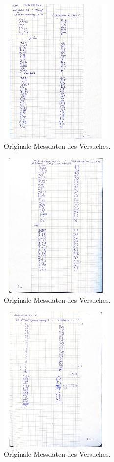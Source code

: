 \begin{figure}[H]
    \centering
    \includegraphics[width=0.5\textwidth]{data/origDaten1.jpg}
    \caption{Originale Messdaten des Versuches.}
    \label{fig:origData1}
\end{figure}
\begin{figure}[H]
    \centering
    \includegraphics[width=0.5\textwidth]{data/origDaten2.jpg}
    \caption{Originale Messdaten des Versuches.}
    \label{fig:origData2}
\end{figure}
\begin{figure}[H]
    \centering
    \includegraphics[width=0.5\textwidth]{data/origDaten3.jpg}
    \caption{Originale Messdaten des Versuches.}
    \label{fig:origData3}
\end{figure}